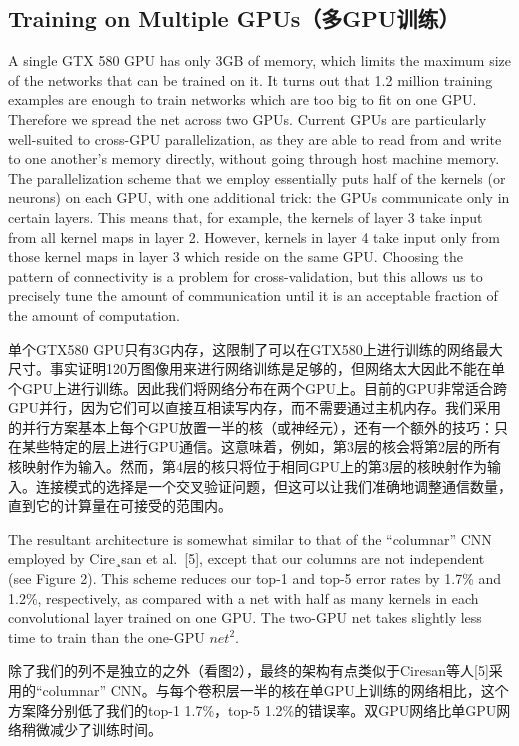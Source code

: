 \documentclass[12pt,a4paper,UTF8,twoside]{book}
\begin{document}
\hypertarget{training-on-multiple-gpusux591agpuux8badux7ec3}{%
\subsection{Training on Multiple GPUs（多GPU训练）}\label{training-on-multiple-gpusux591agpuux8badux7ec3}}

A single GTX 580 GPU has only 3GB of memory, which limits the maximum size of the networks that can be trained on it. It turns out that 1.2 million training examples are enough to train networks which are too big to fit on one GPU. Therefore we spread the net across two GPUs. Current GPUs are particularly well-suited to cross-GPU parallelization, as they are able to read from and write to one another's memory directly, without going through host machine memory. The parallelization scheme that we employ essentially puts half of the kernels (or neurons) on each GPU, with one additional trick: the GPUs communicate only in certain layers. This means that, for example, the kernels of layer 3 take input from all kernel maps in layer 2. However, kernels in layer 4 take input only from those kernel maps in layer 3 which reside on the same GPU. Choosing the pattern of connectivity is a problem for cross-validation, but this allows us to precisely tune the amount of communication until it is an acceptable fraction of the amount of computation.

单个GTX580 GPU只有3G内存，这限制了可以在GTX580上进行训练的网络最大尺寸。事实证明120万图像用来进行网络训练是足够的，但网络太大因此不能在单个GPU上进行训练。因此我们将网络分布在两个GPU上。目前的GPU非常适合跨GPU并行，因为它们可以直接互相读写内存，而不需要通过主机内存。我们采用的并行方案基本上每个GPU放置一半的核（或神经元），还有一个额外的技巧：只在某些特定的层上进行GPU通信。这意味着，例如，第3层的核会将第2层的所有核映射作为输入。然而，第4层的核只将位于相同GPU上的第3层的核映射作为输入。连接模式的选择是一个交叉验证问题，但这可以让我们准确地调整通信数量，直到它的计算量在可接受的范围内。

The resultant architecture is somewhat similar to that of the ``columnar'' CNN employed by Cire¸san et al.~{[}5{]}, except that our columns are not independent (see Figure 2). This scheme reduces our top-1 and top-5 error rates by 1.7\% and 1.2\%, respectively, as compared with a net with half as many kernels in each convolutional layer trained on one GPU. The two-GPU net takes slightly less time to train than the one-GPU \(net^2\).

除了我们的列不是独立的之外（看图2），最终的架构有点类似于Ciresan等人{[}5{]}采用的``columnar'' CNN。与每个卷积层一半的核在单GPU上训练的网络相比，这个方案降分别低了我们的top-1 1.7\%，top-5 1.2\%的错误率。双GPU网络比单GPU网络稍微减少了训练时间。
\end{document}
